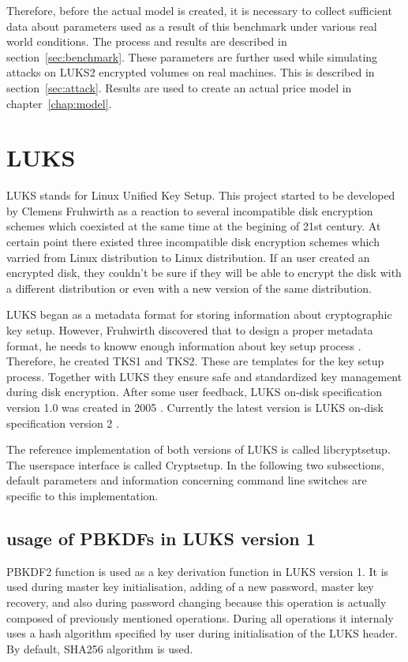 \documentclass[nolof]{fithesis3}
\begin{document}
Therefore, before the actual model is created, it is necessary to collect sufficient data about parameters used as a result of  this benchmark under various real world conditions. The process and results are described in section~\ref{sec:benchmark}. These parameters are further used while simulating attacks on LUKS2 encrypted volumes on real machines.  This is described in section~\ref{sec:attack}. Results are used to create an actual price model in chapter~\ref{chap:model}.

\section{LUKS}
LUKS stands for Linux Unified Key Setup. This project started to be developed by Clemens Fruhwirth as a reaction to several incompatible disk encryption schemes which coexisted at the same time at the begining of 21st century. At certain point there existed three incompatible disk encryption schemes which varried from Linux distribution to Linux distribution. If an user created an encrypted disk, they couldn't be sure if they will be able to encrypt the disk with a different distribution or even with a new version of the same distribution.

LUKS began as a metadata format for storing information about cryptographic key setup. However, Fruhwirth discovered that to design a proper metadata format, he needs to knoww enough information about key setup process \parencite{newmethods}. Therefore, he created TKS1 and TKS2. These are templates for the key setup process. Together with LUKS they ensure safe and standardized key management during disk encryption. After some user feedback, LUKS on-disk specification version 1.0 was created in 2005 \parencite{luks1}. Currently the latest version is LUKS on-disk specification version 2 \parencite{luks2}.

The reference implementation of both versions of LUKS is called libcryptsetup. The userspace interface is called Cryptsetup. In the following two subsections, default parameters and information concerning command line switches are specific to this implementation.

\subsection{usage of PBKDFs in LUKS version 1}
\label{luks1}
PBKDF2 function is used as a key derivation function in LUKS version 1. It is used during master key initialisation, adding of a new password, master key recovery, and also during password changing because this operation is actually composed of previously mentioned operations. During all operations it internaly uses a hash algorithm specified by user during initialisation of the LUKS header. By default, SHA256 algorithm is used.
\end{document}

